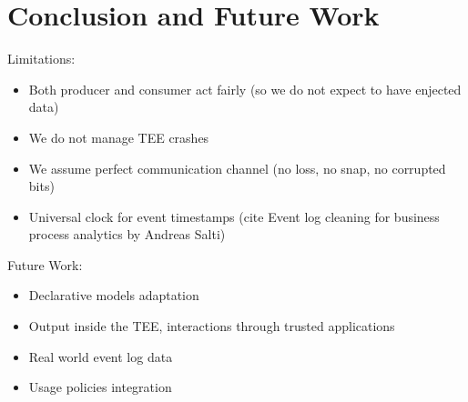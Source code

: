 \section{Conclusion and Future Work}
Limitations:
\begin{itemize}
    \item Both producer and consumer act fairly (so we do not expect to have enjected data)
    \item We do not manage TEE crashes
    \item We assume perfect communication channel (no loss, no snap, no corrupted bits)
    \item Universal clock for event timestamps (cite Event log cleaning for business process analytics by  Andreas Salti)
\end{itemize} 
Future Work:
\begin{itemize}
    \item Declarative models adaptation
    \item Output inside the TEE, interactions through trusted applications
    \item Real world event log data
    \item Usage policies integration
\end{itemize}


